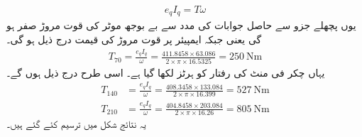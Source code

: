 \begin{itemize}
\begin{align}
e_q I_q=T \omega
\end{align}
یوں پچھلے جزو سے حاصل جوابات کی مدد سے بے بوجھ موٹر کی قوت مروڑ  صفر ہو گی یعنی   جبکہ   ایمپیئر پر قوت مروڑ کی قیمت درج ذیل ہو گی۔
\begin{align*}
T_{70}=\frac{e_q I_q}{\omega}=\frac{411.8458 \times 63.086}{2 \times \pi \times 16.5325}=\SI{250}{\newton \meter}
\end{align*}
یہاں  چکر فی منٹ کی رفتار کو  ہرٹز لکھا گیا ہے۔ اسی طرح درج ذیل ہوں گے۔
\begin{align*}
T_{140}&=\frac{e_q I_q}{\omega}=\frac{408.3458 \times 133.084}{2 \times \pi \times 16.399}=\SI{527}{\newton \meter}\\
T_{210}&=\frac{e_q I_q}{\omega}=\frac{404.8458 \times  203.084}{2 \times \pi \times 16.26}=\SI{805}{\newton \meter}
\end{align*}
یہ نتائج شکل   میں ترسیم کئے گئے ہیں۔
\end{itemize}
